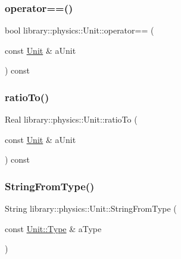 \mbox{\label{classlibrary_1_1physics_1_1_unit_a026f9b92c14aef78e7f73ac7a6baa9af}} 
\subsubsection{\texorpdfstring{operator==()}{operator==()}}
{\footnotesize\ttfamily bool library\+::physics\+::\+Unit\+::operator== (\begin{DoxyParamCaption}\item[{const \hyperlink{classlibrary_1_1physics_1_1_unit}{Unit} \&}]{a\+Unit }\end{DoxyParamCaption}) const}

\mbox{\label{classlibrary_1_1physics_1_1_unit_a23f1befd7161e4f70e5cb84bb851c347}} 
\subsubsection{\texorpdfstring{ratio\+To()}{ratioTo()}}
{\footnotesize\ttfamily Real library\+::physics\+::\+Unit\+::ratio\+To (\begin{DoxyParamCaption}\item[{const \hyperlink{classlibrary_1_1physics_1_1_unit}{Unit} \&}]{a\+Unit }\end{DoxyParamCaption}) const}

\mbox{\label{classlibrary_1_1physics_1_1_unit_a97162c115f15f4eb2221dd65f36cd128}} 
\subsubsection{\texorpdfstring{String\+From\+Type()}{StringFromType()}}
{\footnotesize\ttfamily String library\+::physics\+::\+Unit\+::\+String\+From\+Type (\begin{DoxyParamCaption}\item[{const \hyperlink{classlibrary_1_1physics_1_1_unit_ab01b0024991fd80f3e5ef7c8282fccc1}{Unit\+::\+Type} \&}]{a\+Type }\end{DoxyParamCaption})\hspace{0.3cm}{\ttfamily [static]}}

